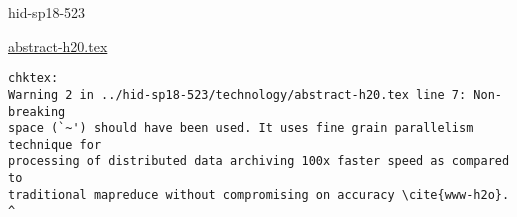 

\begin{IU}

hid-sp18-523

\href{https://github.com/cloudmesh-community/hid-sp18-523/blob/master//technology/abstract-h20.tex}{abstract-h20.tex}

\begin{tiny}
\begin{verbatim}
chktex:
Warning 2 in ../hid-sp18-523/technology/abstract-h20.tex line 7: Non-breaking
space (`~') should have been used. It uses fine grain parallelism technique for
processing of distributed data archiving 100x faster speed as compared to
traditional mapreduce without compromising on accuracy \cite{www-h2o}.
^
\end{verbatim}
\end{tiny}
\end{IU}



